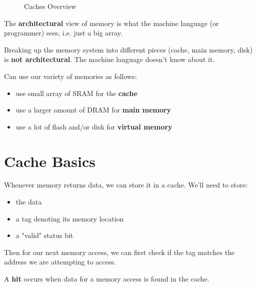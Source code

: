 \newpage

\begin{figure}[ht]
	\centering
	\caption{Caches Overview}
	\label{fig:caches-overview}
\end{figure}

\begin{definition}
	The \textbf{architectural} view of memory is what the machine language (or programmer) sees, i.e. just a big array.
\end{definition}
\begin{note}
	Breaking up the memory system into different pieces (cache, main memory, disk) is \textbf{not architectural}. The machine language doesn't know about it.
\end{note}

Can use our variety of memories as follows:
\begin{itemize}
	\item use small array of SRAM for the \textbf{cache}
	\item use a larger amount of DRAM for \textbf{main memory}
	\item use a lot of flash and/or disk for \textbf{virtual memory}
\end{itemize}

\section{Cache Basics}

Whenever memory returns data, we can store it in a cache. We'll need to store:
\begin{itemize}
	\item the data
	\item a tag denoting its memory location
	\item a "valid" status bit
\end{itemize}

Then for our next memory access, we can first check if the tag matches the address we are attempting to access.


\begin{definition}
	A \textbf{hit} occurs when data for a memory access is found in the cache.
\end{definition}

